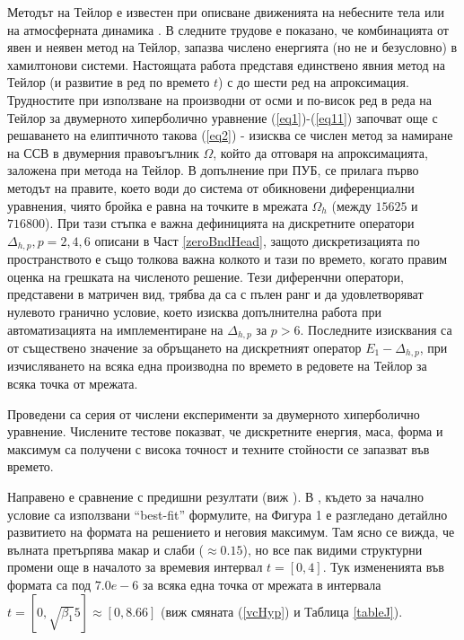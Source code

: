 \documentclass[a4paper]{article}
\newcommand{\rf}[1]{(\ref{#1})}
\theoremstyle{remark}
\begin{document}
\begin{large}
Методът на Тейлор е известен при описване движенията на небесните тела \cite{ref599} или на атмосферната динамика \cite{ref600}. В следните трудове \cite{ref1599, ref15999} е показано, че комбинацията от явен и неявен метод на Тейлор, запазва числено енергията (но не и безусловно) в хамилтонови системи. Настоящата работа представя единствено явния метод на Тейлор (и развитие в ред по времето $t$) с до шести ред на апроксимация. Трудностите при използване на производни от осми и по-висок ред в реда на Тейлор за двумерното хиперболично уравнение \rf{eq1}-\rf{eq11} започват още с решаването на елиптичното такова \rf{eq2} - изисква се числен метод за намиране на ССВ в двумерния правоъгълник $\Omega$, който да отговаря на апроксимацията, заложена при метода на Тейлор. В допълнение при ПУБ, се прилага първо методът на правите, което води до система от обикновени диференциални уравнения, чиято бройка е равна на точките в мрежата $\Omega_h$ (между $15 625$ и $716 800$). При тази стъпка е важна дефиницията на дискретните оператори $\Delta_{h,p}, p=2,4,6$ описани в Част \ref{zeroBndHead}, защото дискретизацията по пространството е също толкова важна колкото и тази по времето, когато правим оценка на грешката на численото решение. Тези диференчни оператори, представени в матричен вид, трябва да са с пълен ранг и да удовлетворяват нулевото гранично условие, което изисква допълнителна работа при автоматизацията на имплементиране на $\Delta_{h,p}$ за $p>6$. Последните изисквания са от съществено значение за обръщането на дискретният оператор $E_1 - \Delta_{h,p}$, при изчисляването на всяка една производна по времето в редовете на Тейлор за всяка точка от мрежата.

Проведени са серия от числени експерименти за двумерното хиперболично уравнение. Числените тестове показват, че дискретните енергия, маса, форма и максимум са получени с висока точност и техните стойности се запазват във времето. 

Направено е сравнение с предишни резултати (виж \cite{ref21, ref20, ref23, ref22, ref24}). В \cite{ref20}, където за начално условие са използвани ``best-fit'' формулите, на Фигура 1 е разгледано детайлно развитието на формата на решението и неговия максимум. Там ясно се вижда, че вълната претърпява макар и слаби ($\approx 0.15$), но все пак видими структурни промени още в началото за времевия интервал $t=[0, 4]$. Тук измененията във формата са под $7.0e-6$ за всяка една точка от мрежата в интервала $t=[0, \sqrt{\beta_1} 5] \approx [0, 8.66]$ (виж смяната \rf{vcHyp} и Таблица \ref{tableJ}).


\end{large}
\end{document}
